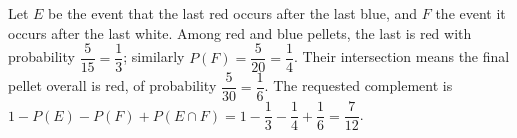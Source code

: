 Let $E$ be the event that the last red occurs after the last blue, and $F$ the event it occurs after the last white. Among red and blue pellets, the last is red with probability $\dfrac{5}{15}=\dfrac{1}{3}$; similarly $P(F)=\dfrac{5}{20}=\dfrac{1}{4}$. Their intersection means the final pellet overall is red, of probability $\dfrac{5}{30}=\dfrac{1}{6}$. The requested complement is $1-P(E)-P(F)+P(E\cap F)=1-\dfrac{1}{3}-\dfrac{1}{4}+\dfrac{1}{6}=\boxed{\dfrac{7}{12}}$.
